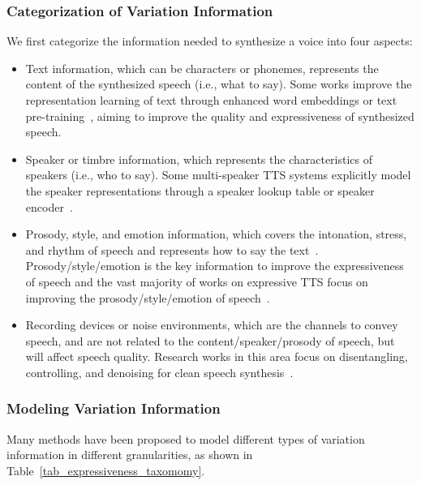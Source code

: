 \documentclass{article}
\begin{document}
\subsubsection{Categorization of Variation Information} We first categorize the information needed to synthesize a voice into four aspects: 
\begin{itemize}[leftmargin=*]
\item Text information, which can be characters or phonemes, represents the content of the synthesized speech (i.e., what to say). Some works improve the representation learning of text through enhanced word embeddings or text pre-training~\cite{fang2019towards,hayashi2019pre,xiao2020improving,jia2021png}, aiming to improve the quality and expressiveness of synthesized speech.
\item Speaker or timbre information, which represents the characteristics of speakers (i.e., who to say). Some multi-speaker TTS systems explicitly model the speaker representations through a speaker lookup table or speaker encoder~\cite{gibiansky2017deep,ping2018deep,jia2018transfer,moss2020boffin,chen2020multispeech}. 
\item Prosody, style, and emotion information, which covers the intonation, stress, and rhythm of speech and represents how to say the text~\cite{wagner2010experimental,ladd2008intonational}. Prosody/style/emotion is the key information to improve the expressiveness of speech and the vast majority of works on expressive TTS focus on improving the prosody/style/emotion of speech~\cite{skerry2018towards,wang2018style,stanton2018predicting,gao2020interactive,um2020emotional,sun2020generating}. 
\item Recording devices or noise environments, which are the channels to convey speech, and are not related to the content/speaker/prosody of speech, but will affect speech quality. Research works in this area focus on disentangling, controlling, and denoising for clean speech synthesis~\cite{hsu2019disentangling,chen2021adaspeech,zhang2020denoising}. 
\end{itemize}


\subsubsection{Modeling Variation Information}
Many methods have been proposed to model different types of variation information in different granularities, as shown in Table~\ref{tab_expressiveness_taxomomy}.
\end{document}
